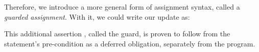 \documentclass[sigplan,review]{acmart}\settopmatter{printfolios=true,printccs=false,printacmref=false}
\begin{document}
Therefore, we introduce a more general form of assignment syntax, called 
a \emph{guarded assignment}. With it, we could write our 
update as:
\begin{code}
\>[9]\AgdaSpace{}%
\AgdaSpace{}%
\AgdaSpace{}%
\AgdaOperator{\AgdaPrimitive{+}}\AgdaSpace{}%
\AgdaSymbol{(}\AgdaSpace{}%
\AgdaOperator{\AgdaFunction{!}}\AgdaSpace{}%
\AgdaSymbol{)}\AgdaSpace{}%
\AgdaSpace{}%
\AgdaSpace{}%
\AgdaSpace{}%
\AgdaSymbol{(}\AgdaSpace{}%
\AgdaOperator{\AgdaFunction{<}}\AgdaSpace{}%
\AgdaSpace{}%
\AgdaSymbol{)}\AgdaSpace{}%
\end{code}
This additional assertion  
\AgdaSymbol{(}\AgdaSpace{}%
\AgdaOperator{\AgdaFunction{<}}\AgdaSpace{}%
\AgdaSpace{}%
\AgdaSymbol{)}\AgdaSpace{}%
, called the guard, is proven to follow from the statement's pre-condition as a
deferred obligation, separately from the program.
\end{document}

